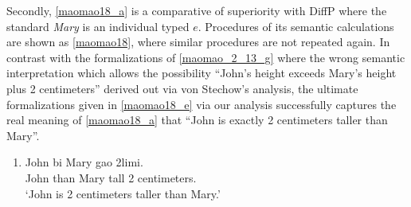 \documentclass{ctexart}
\begin{document}
Secondly, \ref{maomao18_a} is a comparative of superiority with DiffP where the standard \textit{Mary} is an individual typed $e$. Procedures of its semantic calculations are shown as \ref{maomao18}, where similar procedures are not repeated again. In contrast with the formalizations of \ref{maomao_2_13_g} where the wrong semantic interpretation which allows the possibility ``John's height exceeds Mary's height plus 2 centimeters'' derived out via von Stechow's analysis, the ultimate formalizations given in \ref{maomao18_e} via our analysis successfully captures the real meaning of \ref{maomao18_a} that ``John is exactly 2 centimeters taller than Mary''.

\begin{enumerate}
    \item \label{maomao18_a}
    John bi \enspace \enspace Mary gao \enspace \enspace \enspace \enspace 2limi. \\
    John than Mary tall 2 centimeters. \\
    `John is 2 centimeters taller than Mary.'
\end{enumerate}
\end{document}
